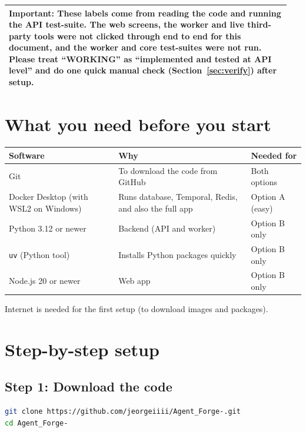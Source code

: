 \documentclass[11pt,a4paper]{article}
\newenvironment{important}
  {\par\smallskip\noindent\begin{tabular}{|p{0.95\linewidth}|}\hline\rowcolor{noteg}\vspace{2pt}\textbf{Important: }}
  {\vspace{2pt}\\\hline\end{tabular}\par\smallskip}
\begin{document}
\begin{important}
These labels come from reading the code and running the \textbf{API test-suite}. The web
screens, the worker and live third-party tools were \textbf{not} clicked through end to end
for this document, and the worker and core test-suites were not run. Please treat
``WORKING'' as ``implemented and tested at API level'' and do one quick manual check
(Section~\ref{sec:verify}) after setup.
\end{important}

\section{What you need before you start}

\begin{longtable}{@{}L{4cm}L{7cm}L{4.4cm}@{}}
\toprule
\textbf{Software} & \textbf{Why} & \textbf{Needed for} \\
\midrule
\endhead
Git & To download the code from GitHub & Both options \\
Docker Desktop (with WSL2 on Windows) & Runs database, Temporal, Redis, and also the full app & Option A (easy) \\
Python 3.12 or newer & Backend (API and worker) & Option B only \\
\texttt{uv} (Python tool) & Installs Python packages quickly & Option B only \\
Node.js 20 or newer & Web app & Option B only \\
\bottomrule
\end{longtable}

Internet is needed for the first setup (to download images and packages).

\section{Step-by-step setup}

\subsection{Step 1: Download the code}

\begin{lstlisting}[language=bash]
git clone https://github.com/jeorgeiiii/Agent_Forge-.git
cd Agent_Forge-
\end{lstlisting}
\end{document}
